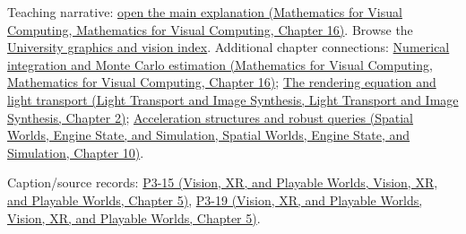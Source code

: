 Teaching narrative: \href{../02-Mathematics-for-Visual-Computing/main.pdf\#nameddest=03-visual-computing-i-ch012-numerical-integration-and-monte-carlo-estimation}{open the main explanation (Mathematics for Visual Computing, Mathematics for Visual Computing, Chapter 16)}. Browse the \hyperref[appendix-a6d556a4ef50-university-graphics-vision-and-photography---independent-series]{University graphics and vision index}. Additional chapter connections: \href{../02-Mathematics-for-Visual-Computing/main.pdf\#nameddest=03-visual-computing-i-ch012-numerical-integration-and-monte-carlo-estimation}{Numerical integration and Monte Carlo estimation (Mathematics for Visual Computing, Mathematics for Visual Computing, Chapter 16)}; \href{../04-Light-Transport-and-Image-Synthesis/main.pdf\#nameddest=03-visual-computing-i-ch007-the-rendering-equation-and-light-transport}{The rendering equation and light transport (Light Transport and Image Synthesis, Light Transport and Image Synthesis, Chapter 2)}; \href{../05-Spatial-Worlds-Engine-State-and-Simulation/main.pdf\#nameddest=04-visual-computing-ii-ch029-acceleration-structures-and-robust-queries-1}{Acceleration structures and robust queries (Spatial Worlds, Engine State, and Simulation, Spatial Worlds, Engine State, and Simulation, Chapter 10)}.

Caption/source records: \href{../07-Vision-XR-and-Playable-Worlds/main.pdf\#nameddest=04-visual-computing-ii-ch036-p3-15---ray-tracing}{P3-15 (Vision, XR, and Playable Worlds, Vision, XR, and Playable Worlds, Chapter 5)}, \href{../07-Vision-XR-and-Playable-Worlds/main.pdf\#nameddest=04-visual-computing-ii-ch036-p3-19---shadows-part-2}{P3-19 (Vision, XR, and Playable Worlds, Vision, XR, and Playable Worlds, Chapter 5)}.
